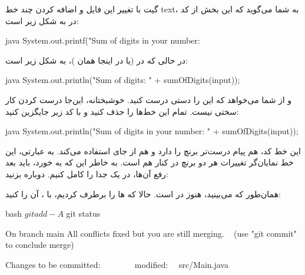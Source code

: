 گیت با تغییر این فایل و اضافه کردن چند خط text، به شما می‌گوید که این بخش
از کد در  به شکل زیر است:

\begin{codebox}{java}
System.out.printf("Sum of digits in your number: %
\end{codebox}

در حالی که در  (یا در اینجا همان )،
به شکل زیر است:

\begin{codebox}{java}
System.out.println("Sum of digits: " + sumOfDigits(input));
\end{codebox}

و از شما می‌خواهد که این  را دستی درست کنید. خوشبختانه،
این‌جا درست کردن  کار سختی نیست. تمام این خط‌ها را حذف کنید و
با کد زیر جایگزین کنید:

\begin{codebox}{java}
System.out.println("Sum of digits in your number: " + sumOfDigits(input));
\end{codebox}

این خط کد، هم پیام درست‌تر برنچ  را دارد و هم
از  جای  استفاده می‌کند. به
عبارتی، این خط نمایان‌گر تغییرات هر دو برنچ در کنار هم است. به خاطر این
که  به  خورد، باید بعد رفع آن‌ها، در یک
 جدا  را کامل کنیم. دوباره 
بزنید:


همان‌طور که می‌بینید،  هنوز در 
است. حالا که  ها را برطرف کردیم، با ،
آن را  کنید:

\begin{codebox}{bash}
$ git add -A  
  
$ git status  
  
On branch main  
All conflicts fixed but you are still merging.  
  (use "git commit" to conclude merge)  
  
Changes to be committed:  
        modified:   src/Main.java
\end{codebox}

